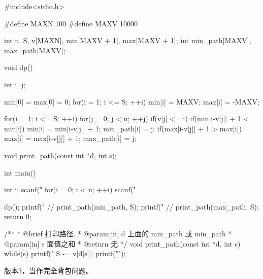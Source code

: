 \begin{Codex}[label=coin_change2.c]
#include<stdio.h>

#define MAXN 100
#define MAXV 10000

int n, S, v[MAXN], min[MAXV + 1], max[MAXV + 1];
int min_path[MAXV], max_path[MAXV];

void dp() {
    int i, j;

    min[0] = max[0] = 0;
    for(i = 1; i <= S; ++i) {
        min[i] = MAXV; 
        max[i] = -MAXV;
    }

    for(i = 1; i <= S; ++i) {
        for(j = 0; j < n; ++j) if(v[j] <= i) {
            if(min[i-v[j]] + 1 < min[i]) {
                min[i] = min[i-v[j]] + 1;
                min_path[i] = j;
            }
            if(max[i-v[j]] + 1 > max[i]) {
                max[i] = max[i-v[j]] + 1;
                max_path[i] = j;
            }
        }
    }
}

void print_path(const int *d, int s);

int main() {
    int i;
    scanf("%
    for(i = 0; i < n; ++i) scanf("%

    dp();
    printf("%
    // print_path(min_path, S);
    printf("%
    // print_path(max_path, S);
    return 0;
}

/**
 * @brief 打印路径.
 * @param[in] d 上面的 min_path 或 min_path
 * @param[in] s 面值之和
 * @return 无
 */
void print_path(const int *d, int s) {
    while(s) {
        printf("%
        S -= v[d[s]];
    }
    printf("\n");
}
\end{Codex}

版本3，当作完全背包问题。

